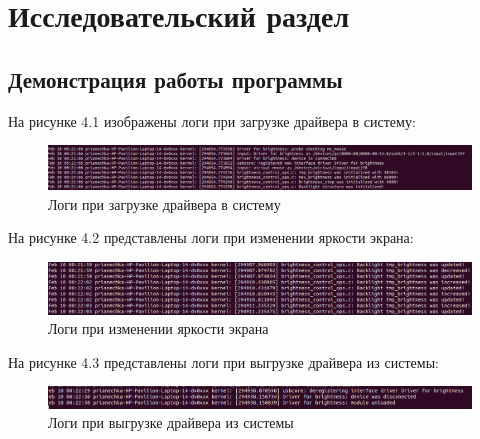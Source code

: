 \section{Исследовательский раздел}

\subsection{Демонстрация работы программы}
На рисунке 4.1 изображены логи при загрузке драйвера в систему:
\FloatBarrier
\begin{figure}[h]	
	\begin{center}
		\includegraphics[width=\linewidth]{inc/1.png}
	\end{center}
	\captionsetup{justification=centering}
	\caption{Логи при загрузке драйвера в систему}
\end{figure}
\FloatBarrier

На рисунке 4.2 представлены логи при изменении яркости экрана:
\FloatBarrier
\begin{figure}[h]	
	\begin{center}
		\includegraphics[width=\linewidth]{inc/2.png}
	\end{center}
	\captionsetup{justification=centering}
	\caption{Логи при изменении яркости экрана}
\end{figure}
\FloatBarrier

На рисунке 4.3 представлены логи при выгрузке драйвера из системы:
\FloatBarrier
\begin{figure}[h]	
	\begin{center}
		\includegraphics[width=\linewidth]{inc/3.png}
	\end{center}
	\captionsetup{justification=centering}
	\caption{Логи при выгрузке драйвера из системы}
\end{figure}
\FloatBarrier